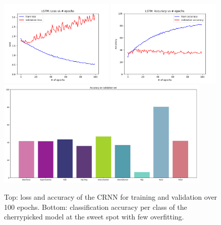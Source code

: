     \begin{figure}[t]
        \centering
        \includegraphics[width=0.49\textwidth]{images/loss}
        \includegraphics[width=0.49\textwidth]{images/acc}
        \includegraphics[width=0.91\textwidth]{images/val_acc}
        \caption{Top: loss and accuracy of the CRNN for training and validation over 100 epochs. Bottom: classification accuracy per class of the cherrypicked model at the sweet spot with few overfitting.}
        \label{performance}
    \end{figure}

